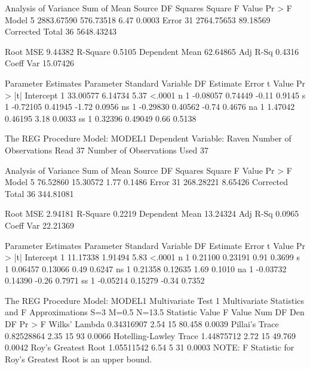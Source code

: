 \documentclass{article}
\begin{document}
\begin{Woutput}
                             Analysis of Variance
                                    Sum of           Mean
Source                   DF        Squares         Square    F Value    Pr > F
Model                     5     2883.67590      576.73518       6.47    0.0003
Error                    31     2764.75653       89.18569
Corrected Total          36     5648.43243

Root MSE              9.44382    R-Square     0.5105
Dependent Mean       62.64865    Adj R-Sq     0.4316
Coeff Var            15.07426

                        Parameter Estimates
                     Parameter       Standard
Variable     DF       Estimate          Error    t Value    Pr > |t|
Intercept     1       33.00577        6.14734       5.37      <.0001
n             1       -0.08057        0.74449      -0.11      0.9145
s             1       -0.72105        0.41945      -1.72      0.0956
ns            1       -0.29830        0.40562      -0.74      0.4676
na            1        1.47042        0.46195       3.18      0.0033
ss            1        0.32396        0.49049       0.66      0.5138

The REG Procedure
Model: MODEL1
Dependent Variable: Raven
Number of Observations Read          37
Number of Observations Used          37

                             Analysis of Variance
                                    Sum of           Mean
Source                   DF        Squares         Square    F Value    Pr > F
Model                     5       76.52860       15.30572       1.77    0.1486
Error                    31      268.28221        8.65426
Corrected Total          36      344.81081

Root MSE              2.94181    R-Square     0.2219
Dependent Mean       13.24324    Adj R-Sq     0.0965
Coeff Var            22.21369

                        Parameter Estimates
                     Parameter       Standard
Variable     DF       Estimate          Error    t Value    Pr > |t|
Intercept     1       11.17338        1.91494       5.83      <.0001
n             1        0.21100        0.23191       0.91      0.3699
s             1        0.06457        0.13066       0.49      0.6247
ns            1        0.21358        0.12635       1.69      0.1010
na            1       -0.03732        0.14390      -0.26      0.7971
ss            1       -0.05214        0.15279      -0.34      0.7352

The REG Procedure
Model: MODEL1
Multivariate Test 1
                 Multivariate Statistics and F Approximations
                            S=3    M=0.5    N=13.5
Statistic                        Value    F Value    Num DF    Den DF    Pr > F
Wilks' Lambda               0.34316907       2.54        15    80.458    0.0039
Pillai's Trace              0.82528864       2.35        15        93    0.0066
Hotelling-Lawley Trace      1.44875712       2.72        15    49.769    0.0042
Roy's Greatest Root         1.05511542       6.54         5        31    0.0003
         NOTE: F Statistic for Roy's Greatest Root is an upper bound.


\end{Woutput}
\end{document}

